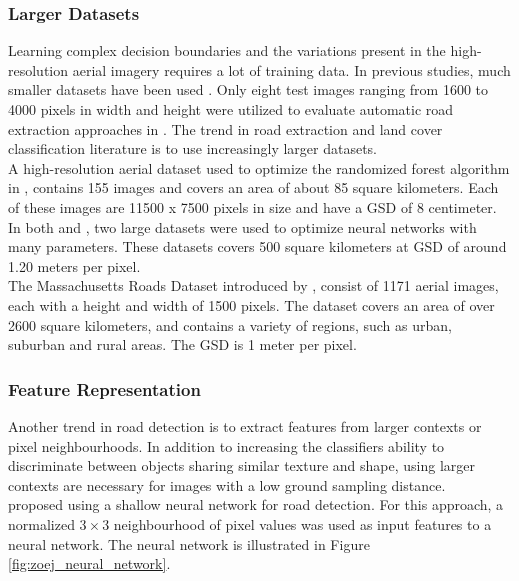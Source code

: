 \subsubsection{Larger Datasets}
Learning complex decision boundaries and the variations present in the high-resolution aerial imagery requires a lot of training data. In previous studies, much smaller datasets have been used \citep{Mokhtarzade_road_ann} \citep{Song_road_extraction_svm}. Only eight test images ranging from 1600 to 4000 pixels in width and height were utilized to evaluate automatic road extraction approaches in \citep{Mayer_road_test}. The trend in road extraction and land cover classification literature is to use increasingly larger datasets.\\

A high-resolution aerial dataset used to optimize the randomized forest algorithm in \citep{Kluckner_semantic_height}, contains  155 images and covers an area of about 85 square kilometers. Each of these images are 11500 x 7500 pixels in size and have a \ac{GSD} of 8 centimeter.\\

In both \citep{Mnih_roads_high_res_aerial_images} and \citep{Mnih_aerial_images_noisy}, two large datasets were used to optimize neural networks with many parameters. These datasets covers 500 square kilometers at \ac{GSD} of around 1.20 meters per pixel.\\

The Massachusetts Roads Dataset introduced by \cite{MnihThesis}, consist of 1171 aerial images, each with a height and width of 1500 pixels. The dataset covers an area of over 2600 square kilometers, and contains a variety of regions, such as urban, suburban and rural areas. The \ac{GSD} is 1 meter per pixel.\\


\subsubsection{Feature Representation}
Another trend in road detection is to extract features from larger contexts or pixel neighbourhoods. In addition to increasing the classifiers ability to discriminate between objects sharing similar texture and shape, using larger contexts are necessary for images with a low ground sampling distance.\\

\cite{Mokhtarzade_road_ann} proposed using a shallow neural network for road detection. For this approach, a normalized $3 \times 3$ neighbourhood of pixel values was used as input features to a neural network. The neural network is illustrated in Figure \ref{fig:zoej_neural_network}. \\

